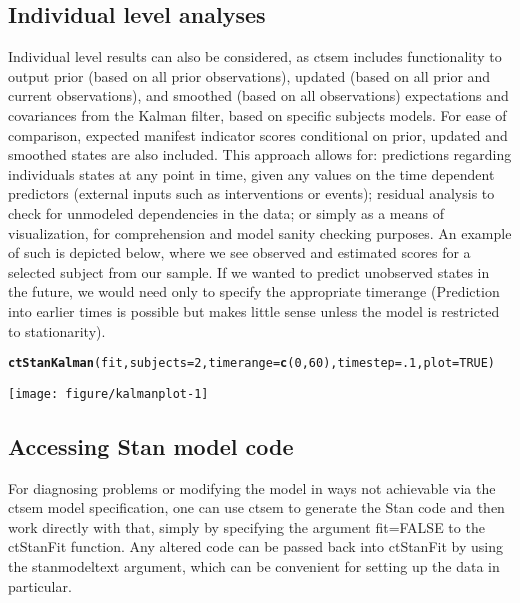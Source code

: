 \documentclass[nojss]{jss}\usepackage[]{graphicx}\usepackage[]{color}
\makeatletter
\def\maxwidth{ %
  \ifdim\Gin@nat@width>\linewidth
    \linewidth
  \else
    \Gin@nat@width
  \fi
}
\newcommand{\hlnum}[1]{\textcolor[rgb]{0.686,0.059,0.569}{#1}}%
\newcommand{\hlstd}[1]{\textcolor[rgb]{0.345,0.345,0.345}{#1}}%
\newcommand{\hlkwc}[1]{\textcolor[rgb]{0.333,0.667,0.333}{#1}}%
\newcommand{\hlkwd}[1]{\textcolor[rgb]{0.737,0.353,0.396}{\textbf{#1}}}%
\newenvironment{kframe}{%
 \def\at@end@of@kframe{}%
 \ifinner\ifhmode%
  \def\at@end@of@kframe{\end{minipage}}%
  \begin{minipage}{\columnwidth}%
 \fi\fi%
 \def\FrameCommand##1{\hskip\@totalleftmargin \hskip-\fboxsep
 \colorbox{shadecolor}{##1}\hskip-\fboxsep
     \hskip-\linewidth \hskip-\@totalleftmargin \hskip\columnwidth}%
 \MakeFramed {\advance\hsize-\width
   \@totalleftmargin\z@ \linewidth\hsize
   \@setminipage}}%
 {\par\unskip\endMakeFramed%
 \at@end@of@kframe}
\newenvironment{knitrout}{}{} %
\makeatother
\begin{document}
\subsection{Individual level analyses}
Individual level results can also be considered, as ctsem includes functionality to output prior (based on all prior observations), updated (based on all prior and current observations), and smoothed (based on all observations) expectations and covariances from the Kalman filter, based on specific subjects models. For ease of comparison, expected manifest indicator scores conditional on prior, updated and smoothed states are also included. This approach allows for: predictions regarding individuals states at any point in time, given any values on the time dependent predictors (external inputs such as interventions or events); residual analysis to check for unmodeled dependencies in the data; or simply as a means of visualization, for comprehension and model sanity checking purposes. An example of such is depicted below, where we see observed and estimated scores for a selected subject from our sample. If we wanted to predict unobserved states in the future, we would need only to specify the appropriate timerange (Prediction into earlier times is possible but makes little sense unless the model is restricted to stationarity).

\begin{knitrout}\small
{}\color{fgcolor}\begin{kframe}
\begin{alltt}
\hlkwd{ctStanKalman}\hlstd{(fit,} \hlkwc{subjects}\hlstd{=}\hlnum{2}\hlstd{,} \hlkwc{timerange}\hlstd{=}\hlkwd{c}\hlstd{(}\hlnum{0}\hlstd{,}\hlnum{60}\hlstd{),} \hlkwc{timestep}\hlstd{=}\hlnum{.1}\hlstd{,} \hlkwc{plot}\hlstd{=}\hlnum{TRUE}\hlstd{)}
\end{alltt}
\end{kframe}

{\centering \texttt{[image: figure/kalmanplot-1]} 

}



\end{knitrout}


\subsection{Accessing Stan model code}
For diagnosing problems or modifying the model in ways not achievable via the ctsem model specification, one can use ctsem to generate the Stan code and then work directly with that, simply by specifying the argument fit=FALSE to the ctStanFit function. Any altered code can be passed back into ctStanFit by using the stanmodeltext argument, which can be convenient for setting up the data in particular.
\end{document}
